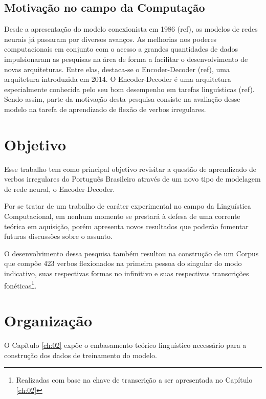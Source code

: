 \subsection{Motivação no campo da Computação}

Desde a apresentação do modelo conexionista em 1986 (ref), os modelos de redes neurais já passaram por diversos avanços. As melhorias nos poderes computacionais em conjunto com o acesso a grandes quantidades de dados impulsionaram as pesquisas na área de forma a facilitar o desenvolvimento de novas arquiteturas. Entre elas, destaca-se o Encoder-Decoder (ref), uma arquitetura introduzida em 2014. O Encoder-Decoder é uma arquitetura especialmente conhecida pelo seu bom desempenho em tarefas linguísticas (ref). Sendo assim, parte da motivação desta pesquisa consiste na avaliação desse modelo na tarefa de aprendizado de flexão de verbos irregulares. 


\section{Objetivo}
\label{sec:objectives}

Esse trabalho tem como principal objetivo revisitar a questão de aprendizado de verbos irregulares do Português Brasileiro através de um novo tipo de modelagem de rede neural, o Encoder-Decoder. 

Por se tratar de um trabalho de caráter experimental no campo da Linguística Computacional, em nenhum momento se prestará à defesa de uma corrente teórica em aquisição, porém apresenta novos resultados que poderão fomentar futuras discussões sobre o assunto. 

O desenvolvimento dessa pesquisa também resultou na construção de um Corpus que compõe 423 verbos flexionados na primeira pessoa do singular do modo indicativo, suas respectivas formas no infinitivo e suas respectivas transcrições fonéticas\footnote{Realizadas com base na chave de transcrição a ser apresentada no Capítulo \ref{ch:02}}.


\section{Organização}
\label{sec:organization}

O Capítulo \ref{ch:02} expõe o embasamento teórico linguístico necessário para a construção dos dados de treinamento do modelo. 

